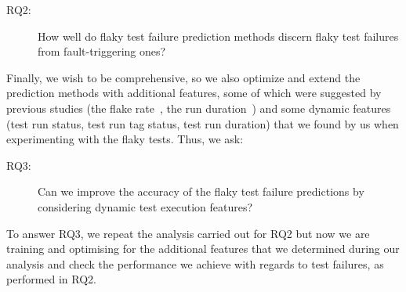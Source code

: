 \begin{description}
\item[RQ2:] How well do flaky test failure prediction methods discern flaky test failures from fault-triggering ones? 
\end{description}

Finally, we wish to be comprehensive, so we also optimize and extend the prediction methods with additional features, some of which were suggested by previous studies (the flake rate~\cite{Kowalczyk2020}, the run duration~\cite{alshammari2021flakeflagger}) and some dynamic features (test run status, test run tag status, test run duration) that we found by us when experimenting with the flaky tests. Thus, we ask:

\begin{description}
\item[RQ3:] Can we improve the accuracy of the flaky test failure predictions by considering dynamic test execution features?
\end{description}

To answer RQ3, we repeat the analysis carried out for RQ2 but now we are training and optimising for the additional features that we determined during our analysis and check the performance we achieve with regards to test failures, as performed in RQ2. 






